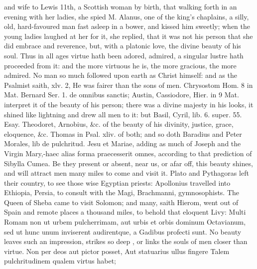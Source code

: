 {and wife to Lewis 11th, a Scottish woman by birth, that walking forth
in an evening with her ladies, she spied M. Alanus, one of the king's
chaplains, a silly, old, hard-favoured man fast asleep in a
bower, and kissed him sweetly; when the young ladies laughed at her for
it, she replied, that it was not his person that she did embrace and
reverence, but, with a platonic love, the divine beauty of his
soul. Thus in all ages virtue hath been adored, admired, a singular
lustre hath proceeded from it: and the more virtuous he is, the more
gracious, the more admired. No man so much followed upon earth as
Christ himself: and as the Psalmist saith, xlv. 2, He was fairer than
the sons of men. Chrysostom Hom. 8 in Mat. Bernard Ser. 1. de omnibus
sanctis; Austin, Cassiodore, Hier. in 9 Mat. interpret it of the
beauty of his person; there was a divine majesty in his looks, it
shined like lightning and drew all men to it: but Basil, Cyril, lib. 6.
super. 55. Esay. Theodoret, Arnobius, \&c. of the beauty of his
divinity, justice, grace, eloquence, \&c. Thomas in Psal. xliv. of both;
and so doth Baradius and Peter Morales, lib de pulchritud. Jesu et
Mariae, adding as much of Joseph and the Virgin Mary,-haec alias forma
praecesserit omnes, according to that prediction of Sibylla
Cumea. Be they present or absent, near us, or afar off, this beauty
shines, and will attract men many miles to come and visit it. Plato and
Pythagoras left their country, to see those wise Egyptian priests:
Apollonius travelled into Ethiopia, Persia, to consult with the Magi,
Brachmanni, gymnosophists. The Queen of Sheba came to visit Solomon;
and many, saith Hierom, went out of Spain and remote places a
thousand miles, to behold that eloquent Livy: Multi Romam non ut
urbem pulcherrimam, aut urbis et orbis dominum Octavianum, sed ut hunc
unum inviserent audirentque, a Gadibus profecti sunt. No beauty leaves
such an impression, strikes so deep , or links the souls of men
closer than virtue.
Non per deos aut pictor posset,
Aut statuarius ullus fingere
Talem pulchritudinem qualem virtus habet;

}
